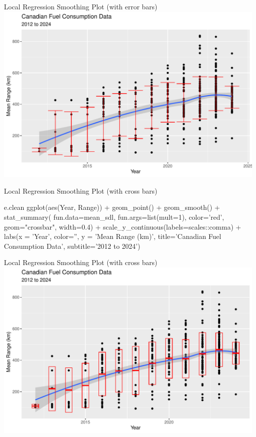 \documentclass[ignorenonframetext,xcolor=x11names]{beamer}
\begin{document}
\begin{frame}{Local Regression Smoothing Plot (with error bars)}
  \includegraphics[width=\textwidth]{fuel.linesSmoothErrorBar.pdf}
\end{frame}

\begin{frame}[fragile]{Local Regression Smoothing Plot (with cross bars)}
\footnotesize
\begin{Rcode}
e.clean %
  ggplot(aes(Year, Range)) +
    geom_point() +
    geom_smooth() +
    stat_summary(
        fun.data=mean_sdl, 
        fun.args=list(mult=1), 
        color='red', 
        geom="crossbar",
        width=0.4) +
    scale_y_continuous(labels=scales::comma) + 
    labs(x = 'Year', color='', y = 'Mean Range (km)', 
    title='Canadian Fuel Consumption Data', 
    subtitle='2012 to 2024')
\end{Rcode}
\end{frame}

\begin{frame}{Local Regression Smoothing Plot (with cross bars)}
  \includegraphics[width=\textwidth]{fuel.linesSmoothCrossBar.pdf}
\end{frame}
\end{document}
